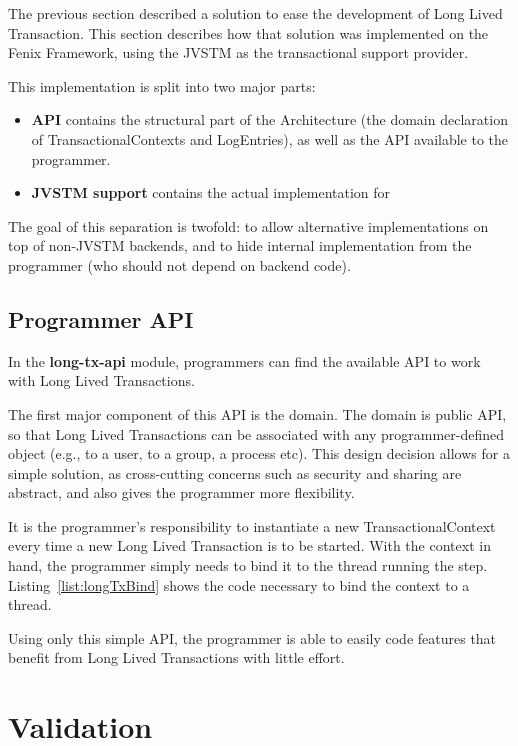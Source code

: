 The previous section described a solution to ease the development of
Long Lived Transaction. This section describes how that solution was
implemented on the Fenix Framework, using the JVSTM as the
transactional support provider.

This implementation is split into two major parts:

\begin{itemize}

\item {\bf API} contains the structural part of the Architecture (the
  domain declaration of TransactionalContexts and LogEntries), as well
  as the API available to the programmer.

\item {\bf JVSTM support} contains the actual implementation for 

\end{itemize}

The goal of this separation is twofold: to allow alternative
implementations on top of non-JVSTM backends, and to hide internal
implementation from the programmer (who should not depend on backend
code).

\subsection{Programmer API}

In the {\bf long-tx-api} module, programmers can find the available
API to work with Long Lived Transactions.

The first major component of this API is the domain. The domain is
public API, so that Long Lived Transactions can be associated with any
programmer-defined object (e.g., to a user, to a group, a process
etc). This design decision allows for a simple solution, as
cross-cutting concerns such as security and sharing are abstract, and
also gives the programmer more flexibility.

It is the programmer's responsibility to instantiate a new
TransactionalContext every time a new Long Lived Transaction is to be
started. With the context in hand, the programmer simply needs to bind
it to the thread running the step. Listing~\ref{list:longTxBind} shows
the code necessary to bind the context to a thread.

Using only this simple API, the programmer is able to easily code
features that benefit from Long Lived Transactions with little effort.

\section{Validation}


